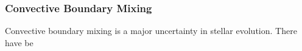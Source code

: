 {\color{purple}
\subsubsection{Convective Boundary Mixing}
}

Convective boundary mixing is a major uncertainty in stellar evolution. There have be


